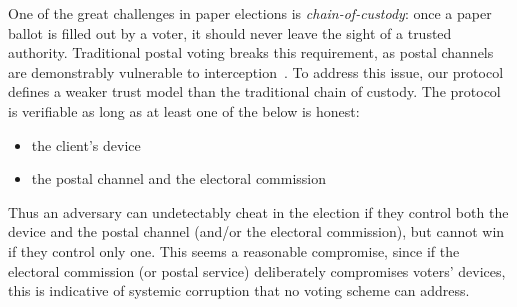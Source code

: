 \documentclass[12pt,a4paper]{article}
\theoremstyle{definition}
\newcounter{protocol}
\begin{document}
One of the great challenges in paper elections is \textit{chain-of-custody}: once a paper ballot is filled out by a voter, it should never leave the sight of a trusted authority. Traditional postal voting breaks this requirement, as postal channels are demonstrably vulnerable to interception~\cite{stewart2010losing}. To address this issue, our protocol defines a weaker trust model than the traditional chain of custody. The protocol is verifiable as long as at least one of the below is honest:
\begin{itemize}
    \item the client's device
    \item the postal channel and the electoral commission
\end{itemize}
Thus an adversary can undetectably cheat in the election if they control both the device and the postal channel (and/or the electoral commission), but cannot win if they control only one. This seems a reasonable compromise, since if the electoral commission (or postal service) deliberately compromises voters' devices, this is indicative of systemic corruption that no voting scheme can address.
\end{document}
